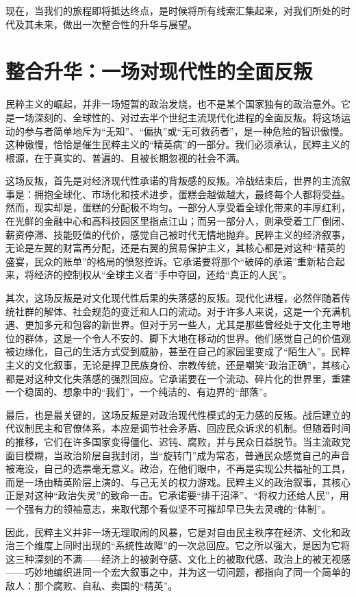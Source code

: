 现在，当我们的旅程即将抵达终点，是时候将所有线索汇集起来，对我们所处的时代及其未来，做出一次整合性的升华与展望。

\section{整合升华：一场对现代性的全面反叛}

民粹主义的崛起，并非一场短暂的政治发烧，也不是某个国家独有的政治意外。它是一场深刻的、全球性的、对过去半个世纪主流现代化进程的全面反叛。将这场运动的参与者简单地斥为“无知”、“偏执”或“无可救药者”，是一种危险的智识傲慢。这种傲慢，恰恰是催生民粹主义的“精英病”的一部分。我们必须承认，民粹主义的根源，在于真实的、普遍的、且被长期忽视的社会不满。

这场反叛，首先是对经济现代性承诺的背叛感的反叛。冷战结束后，世界的主流叙事是：拥抱全球化、市场化和技术进步，蛋糕会越做越大，最终每个人都将受益。然而，现实却是，蛋糕的分配极不均匀。一部分人享受着全球化带来的丰厚红利，在光鲜的金融中心和高科技园区里指点江山；而另一部分人，则承受着工厂倒闭、薪资停滞、技能贬值的代价，感觉自己被时代无情地抛弃。民粹主义的经济叙事，无论是左翼的财富再分配，还是右翼的贸易保护主义，其核心都是对这种“精英的盛宴，民众的账单”的格局的愤怒控诉。它承诺要将那个“破碎的承诺”重新粘合起来，将经济的控制权从“全球主义者”手中夺回，还给“真正的人民”。

其次，这场反叛是对文化现代性后果的失落感的反叛。现代化进程，必然伴随着传统社群的解体、社会规范的变迁和人口的流动。对于许多人来说，这是一个充满机遇、更加多元和包容的新世界。但对于另一些人，尤其是那些曾经处于文化主导地位的群体，这是一个令人不安的、脚下大地在移动的世界。他们感觉自己的价值观被边缘化，自己的生活方式受到威胁，甚至在自己的家园里变成了“陌生人”。民粹主义的文化叙事，无论是捍卫民族身份、宗教传统，还是嘲笑“政治正确”，其核心都是对这种文化失落感的强烈回应。它承诺要在一个流动、碎片化的世界里，重建一个稳固的、想象中的“我们”，一个纯洁的、有边界的“部落”。

最后，也是最关键的，这场反叛是对政治现代性模式的无力感的反叛。战后建立的代议制民主和官僚体系，本应是调节社会矛盾、回应民众诉求的机制。但随着时间的推移，它们在许多国家变得僵化、迟钝、腐败，并与民众日益脱节。当主流政党面目模糊，当政治阶层自我封闭，当“旋转门”成为常态，普通民众感觉自己的声音被淹没，自己的选票毫无意义。政治，在他们眼中，不再是实现公共福祉的工具，而是一场由精英阶层上演的、与己无关的权力游戏。民粹主义的政治叙事，其核心正是对这种“政治失灵”的致命一击。它承诺要“排干沼泽”、“将权力还给人民”，用一个强有力的领袖意志，来取代那个看似坚不可摧却早已失去灵魂的“体制”。

因此，民粹主义并非一场无理取闹的风暴，它是对自由民主秩序在经济、文化和政治三个维度上同时出现的“系统性故障”的一次总回应。它之所以强大，是因为它将这三种深刻的不满——经济上的被剥夺感、文化上的被取代感、政治上的被无视感——巧妙地编织进同一个宏大叙事之中，并为这一切问题，都指向了同一个简单的敌人：那个腐败、自私、卖国的“精英”。


